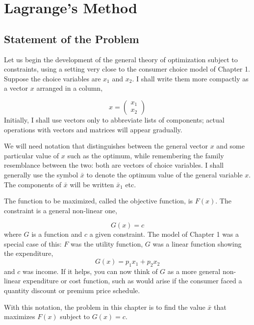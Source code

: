 \chapter{Lagrange’s Method}

\section*{Statement of the Problem}

Let us begin the development of the general theory of optimization subject to constraints, using a setting very close to the consumer choice model of Chapter 1. Suppose the choice variables are $x_1$ and $x_2$. I shall write them more compactly as a vector $x$ arranged in a column,

\begin{equation*}
   x = \left( \begin{array}{c}
   x_1 \\
   x_2
   \end{array}
   \right)
\end{equation*}
Initially, I shall use vectors only to abbreviate lists of components; actual operations with vectors and matrices will appear gradually.

We will need notation that distinguishes between the general vector $x$ and some particular value of $x$ such as the optimum, while remembering the family resemblance between the two: both are vectors of choice variables. I shall generally use the symbol $\bar{x}$ to denote the optimum value of the general variable $x$. The components of $\bar{x}$ will be written $\bar{x}_1$ etc.

The function to be maximized, called the objective function, is $F(x)$. The constraint is a general non-linear one,

\begin{equation}\label{equa2.1}
G(x)=c
\end{equation}
where $G$ is a function and $c$ a given constraint. The model of Chapter 1 was a special case of this: $F$ was the utility function, $G$ was a linear function showing the expenditure,
\begin{equation*}
G(x) = p_1 x_1 + p_2 x_2
\end{equation*}
and $c$ was income. If it helps, you can now think of $G$ as a more general non-linear expenditure or cost function, such as would arise if the consumer faced a quantity discount or premium price schedule.

With this notation, the problem in this chapter is to find the value $\bar{x}$ that maximizes $F(x)$ subject to $G(x)=c$.

